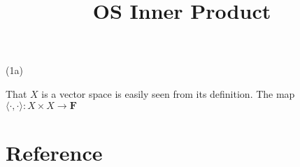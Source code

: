 \documentclass[10pt]{article}
\title{OS Inner Product}
\author{}
\begin{document}
\renewcommand{\setminus}{\mathbin{\backslash}}

(1a)

That $X$ is a vector space is easily seen from its definition. The map $\langle\cdot,\cdot\rangle:X\times X\to\mathbf{F}$

\section*{Reference}
\printbibliography
\end{document}
